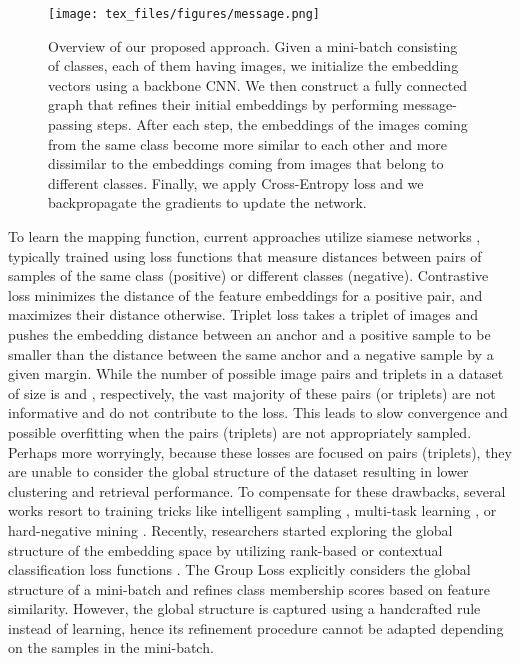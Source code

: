 \documentclass{article}
\begin{document}
\begin{figure*}[hbt!]
\begin{center}
\centerline{\texttt{[image: tex\_files/figures/message.png]}}
   \caption{Overview of our proposed approach. Given a mini-batch consisting of  classes, each of them having  images, we initialize the embedding vectors using a backbone CNN. We then construct a fully connected graph that refines their initial embeddings by performing  message-passing steps. After each step, the embeddings of the images coming from the same class become more similar to each other and more dissimilar to the embeddings coming from images that belong to different classes. Finally, we apply Cross-Entropy loss and we backpropagate the gradients to update the network.}
\label{fig:message}
\end{center}
\end{figure*}

To learn the mapping function, current approaches utilize siamese networks \cite{bromley1994signature}, typically trained using loss functions that measure distances between pairs of samples of the same class (positive) or different classes (negative). 
Contrastive loss \cite{bromley1994signature} minimizes the distance of the feature embeddings for a positive pair, and maximizes their distance otherwise.
Triplet loss \cite{DBLP:conf/nips/SchultzJ03,DBLP:journals/jmlr/WeinbergerS09} takes a triplet of images and pushes the embedding distance between an anchor and a positive sample to be smaller than the distance between the same anchor and a negative sample by a given margin.
While the number of possible image pairs and triplets in a dataset of size  is  and , respectively, the vast majority of these pairs (or triplets) are not informative and do not contribute to the loss. 
This leads to slow convergence and possible overfitting when the pairs (triplets) are not appropriately sampled. Perhaps more worryingly, because these losses are focused on pairs (triplets), they are unable to consider the global structure of the dataset resulting in lower clustering and retrieval performance. To compensate for these drawbacks, several works resort to training tricks like intelligent sampling \cite{DBLP:conf/eccv/GeHDS18,DBLP:conf/iccv/ManmathaWSK17}, multi-task learning \cite{DBLP:conf/cvpr/ZhangZLZ16}, or hard-negative mining \cite{DBLP:conf/cvpr/SchroffKP15, DBLP:journals/corr/abs-2007-12749}. 
Recently, researchers started exploring the global structure of the embedding space by utilizing rank-based \cite{DBLP:conf/cvpr/Cakir0XKS19,DBLP:conf/cvpr/0003CBS18,DBLP:journals/corr/abs-1906-07589} or contextual classification loss functions \cite{DBLP:conf/cvpr/Cakir0XKS19,DBLP:conf/eccv/GrLoss,DBLP:conf/cvpr/0003CBS18,DBLP:journals/corr/abs-1906-07589,DBLP:conf/nips/Sohn16,DBLP:conf/cvpr/SongXJS16,DBLP:conf/aaai/ZhengJSZWH19}. The Group Loss \cite{DBLP:conf/eccv/GrLoss} explicitly considers the global structure of a mini-batch and refines class membership scores based on feature similarity. However, the global structure is captured using a handcrafted rule instead of learning, hence its refinement procedure cannot be adapted depending on the samples in the mini-batch.
\end{document}

